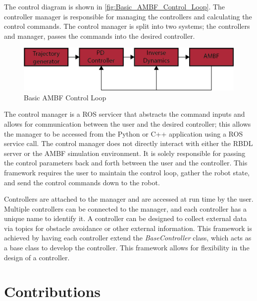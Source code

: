  The control diagram is shown in \autoref{fig:Basic_AMBF_Control_Loop}. The controller manager is responsible for managing the controllers and calculating the control commands. The control manager is split into two systems; the controllers and manager, passes the commands into the desired controller. 

\begin{figure}[h!]
    \centering
    \includegraphics[scale=1.25]{images/sim/control_outline.png}
    \caption[Basic AMBF Control Loop]{Basic AMBF Control Loop}
    \label{fig:Basic_AMBF_Control_Loop}
\end{figure}

The control manager is a ROS servicer that abstracts the command inputs and allows for communication between the user and the desired controller; this allows the manager to be accessed from the Python or C++ application using a ROS service call. The control manager does not directly interact with either the RBDL server or the AMBF simulation environment. It is solely responsible for passing the control parameters back and forth between the user and the controller. This framework requires the user to maintain the control loop, gather the robot state, and send the control commands down to the robot.

Controllers are attached to the manager and are accessed at run time by the user. Multiple controllers can be connected to the manager, and each controller has a unique name to identify it.  A controller can be designed to collect external data via topics for obstacle avoidance or other external information. This framework is achieved by having each controller extend the \textit{BaseController} class, which acts as a base class to develop the controller. This framework allows for flexibility in the design of a controller.


\section{Contributions}

